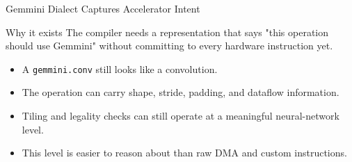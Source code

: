 \documentclass[aspectratio=169,10pt]{beamer}
\newcommand{\code}[1]{\texttt{\footnotesize #1}}
\begin{document}
\begin{frame}{Gemmini Dialect Captures Accelerator Intent}
  \begin{block}{Why it exists}
    The compiler needs a representation that says "this operation should use Gemmini" without committing to every hardware instruction yet.
  \end{block}
  \begin{itemize}
    \item A \code{gemmini.conv} still looks like a convolution.
    \item The operation can carry shape, stride, padding, and dataflow information.
    \item Tiling and legality checks can still operate at a meaningful neural-network level.
    \item This level is easier to reason about than raw DMA and custom instructions.
  \end{itemize}
\end{frame}
\end{document}
